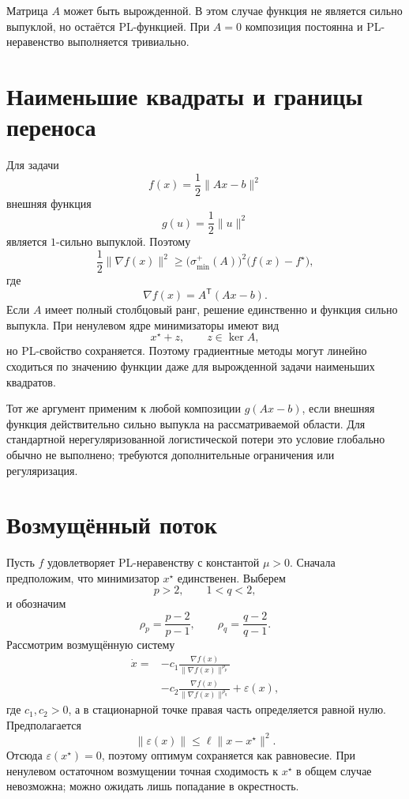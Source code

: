 Матрица \(A\) может быть вырожденной. В этом случае функция не
является сильно выпуклой, но остаётся PL-функцией. При \(A=0\)
композиция постоянна и PL-неравенство выполняется тривиально.

\section{Наименьшие квадраты и границы переноса}

Для задачи
\[
    f(x)=\frac12\lVert Ax-b\rVert^2
\]
внешняя функция
\[
    g(u)=\frac12\lVert u\rVert^2
\]
является \(1\)-сильно выпуклой. Поэтому
\[
    \frac12\lVert\nabla f(x)\rVert^2
    \ge
    \bigl(\sigma_{\min}^{+}(A)\bigr)^2
    \bigl(f(x)-f^\star\bigr),
\]
где
\[
    \nabla f(x)=A^{\mathsf T}(Ax-b).
\]
Если \(A\) имеет полный столбцовый ранг, решение единственно и
функция сильно выпукла. При ненулевом ядре минимизаторы имеют вид
\[
    x^\star+z,
    \qquad
    z\in\ker A,
\]
но PL-свойство сохраняется. Поэтому градиентные методы могут линейно
сходиться по значению функции даже для вырожденной задачи наименьших
квадратов.

Тот же аргумент применим к любой композиции \(g(Ax-b)\), если
внешняя функция действительно сильно выпукла на рассматриваемой
области. Для стандартной нерегуляризованной логистической потери это
условие глобально обычно не выполнено; требуются дополнительные
ограничения или регуляризация.

\section{Возмущённый поток}

Пусть \(f\) удовлетворяет PL-неравенству с константой \(\mu>0\).
Сначала предположим, что минимизатор \(x^\star\) единственен. Выберем
\[
    p>2,
    \qquad
    1<q<2,
\]
и обозначим
\[
    \rho_p=\frac{p-2}{p-1},
    \qquad
    \rho_q=\frac{q-2}{q-1}.
\]
Рассмотрим возмущённую систему
\[
\begin{aligned}
    \dot x
    ={}&
    -c_1
    \frac{\nabla f(x)}{
        \lVert\nabla f(x)\rVert^{\rho_p}
    }
    \\
    &-c_2
    \frac{\nabla f(x)}{
        \lVert\nabla f(x)\rVert^{\rho_q}
    }
    +\varepsilon(x),
\end{aligned}
\]
где \(c_1,c_2>0\), а в стационарной точке правая часть определяется
равной нулю. Предполагается
\[
    \lVert\varepsilon(x)\rVert
    \le
    \ell\lVert x-x^\star\rVert^2.
\]
Отсюда \(\varepsilon(x^\star)=0\), поэтому оптимум сохраняется как
равновесие. При ненулевом остаточном возмущении точная сходимость к
\(x^\star\) в общем случае невозможна; можно ожидать лишь попадание
в окрестность.


